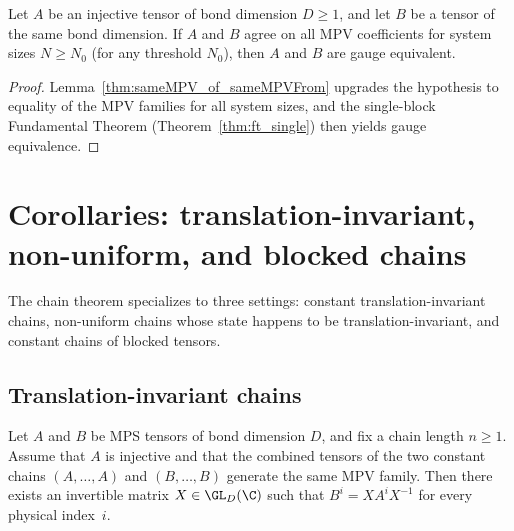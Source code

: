\begin{corollary}%
    \label{thm:ft_singleBlock_finiteLength}
    \leanok
    Let $A$ be an injective tensor of bond dimension $D \ge 1$, and let
    $B$ be a tensor of the same bond dimension. If $A$ and $B$ agree on
    all MPV coefficients for system sizes $N \ge N_0$ (for any threshold
    $N_0$), then $A$ and $B$ are gauge equivalent.
\end{corollary}

\begin{proof}
    \leanok
    Lemma~\ref{thm:sameMPV_of_sameMPVFrom} upgrades the hypothesis to
    equality of the MPV families for all system sizes, and the
    single-block Fundamental Theorem (Theorem~\ref{thm:ft_single}) then yields gauge equivalence.
\end{proof}

\section{Corollaries: translation-invariant, non-uniform, and blocked chains}%
\label{sec:ft_corollaries}

The chain theorem specializes to three settings: constant
translation-invariant chains, non-uniform chains whose state happens to be
translation-invariant, and constant chains of blocked tensors.

\subsection{Translation-invariant chains}

\begin{lemma}
    \label{thm:ti_tensors_single_gauge}
    \leanok
    Let $A$ and $B$ be MPS tensors of bond dimension $D$, and fix a chain
    length $n \ge 1$.
    Assume that $A$ is injective and that the combined tensors of the two
    constant chains $(A, \ldots, A)$ and $(B, \ldots, B)$ generate the same
    MPV family.
    Then there exists an invertible matrix $X \in \GL_D(\C)$ such that
    $B^i = X A^i X^{-1}$ for every physical index~$i$.
\end{lemma}

